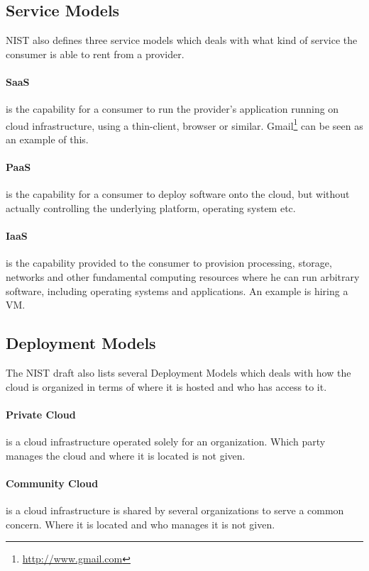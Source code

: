 \documentclass[english,12pt,a4paper]{book}
\begin{document}
\subsection{Service Models}
\ac{NIST} also defines three service models which deals with what kind of
service the consumer is able to rent from a provider.

\paragraph{\ac{SaaS}} is the capability for a consumer to run the provider's
application running on cloud infrastructure, using a thin-client, browser or
similar. Gmail\footnote{\url{http://www.gmail.com}} can be seen as an example
of this.

\paragraph{\ac{PaaS}} is the capability for a consumer to deploy software onto
the cloud, but without actually controlling the underlying platform, operating
system etc.

\paragraph{\ac{IaaS}} is the capability provided to the consumer to provision
processing, storage, networks and other fundamental computing resources where
he can run arbitrary software, including operating systems and applications. An
example is hiring a \ac{VM}.

\subsection{Deployment Models}
The \ac{NIST} draft also lists several Deployment Models which deals with how
the cloud is organized in terms of where it is hosted and who has access to it.

\paragraph{Private Cloud} is a cloud infrastructure operated solely for an
organization. Which party manages the cloud and where it is located is not
given.

\paragraph{Community Cloud} is a cloud infrastructure is shared by several
organizations to serve a common concern. Where it is located and who manages it
is not given.
\end{document}
